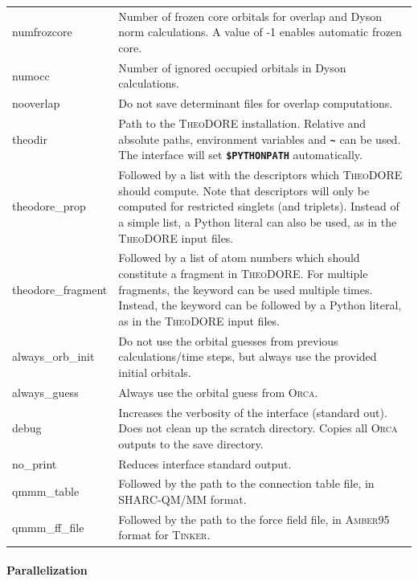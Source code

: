 \documentclass[a4paper,10pt,DIV=15,openany]{scrbook}
\newcommand{\ttt}[1]{\textbf{\texttt{#1}}}
\begin{document}
\begin{table}
\begin{tabular}{>{\ttfamily}lp{12cm}}
\\
numfrozcore             &Number of frozen core orbitals for overlap and Dyson norm calculations. A value of -1 enables automatic frozen core.
\\
numocc                  &Number of ignored occupied orbitals in Dyson calculations.
\\
nooverlap               &Do not save determinant files for overlap computations.
\\
theodir                 &Path to the \textsc{TheoDORE} installation. Relative and absolute paths, environment variables and \ttt{\textasciitilde} can be used. The interface will set \ttt{\$PYTHONPATH} automatically.
\\
theodore\_prop          &Followed by a list with the descriptors which \textsc{TheoDORE} should compute. Note that descriptors will only be computed for restricted singlets (and triplets). Instead of a simple list, a Python literal can also be used, as in the \textsc{TheoDORE} input files.
\\
theodore\_fragment      &Followed by a list of atom numbers which should constitute a fragment in \textsc{TheoDORE}. For multiple fragments, the keyword can be used multiple times. Instead, the keyword can be followed by a Python literal, as in the \textsc{TheoDORE} input files.
\\
always\_orb\_init       &Do not use the orbital guesses from previous calculations/time steps, but always use the provided initial orbitals.
\\
always\_guess           &Always use the orbital guess from \textsc{Orca}.
\\
  debug                 &Increases the verbosity of the interface (standard out). Does not clean up the scratch directory. Copies all \textsc{Orca} outputs to the save directory.
\\
  no\_print             &Reduces interface standard output.
\\
qmmm\_table             &Followed by the path to the connection table file, in SHARC-QM/MM format.
\\
qmmm\_ff\_file          &Followed by the path to the force field file, in \textsc{Amber}95 format for \textsc{Tinker}.
\\
  \hline
  \end{tabular}
\end{table}

\paragraph{Parallelization}
\end{document}
